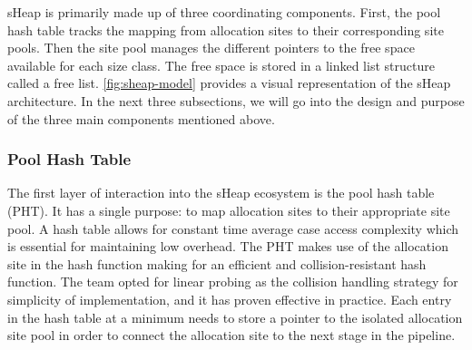 \documentclass[conference]{IEEEtran}
\begin{document}
sHeap is primarily made up of three coordinating components. First, the 
pool hash table tracks the mapping from allocation sites to their 
corresponding site pools. Then the site pool manages the different pointers 
to the free space available for each size class. The free space is stored 
in a linked list structure called a free list. \ref{fig:sheap-model} 
provides a visual representation of the sHeap architecture. In the next 
three subsections, we will go into the design and purpose of the three 
main components mentioned above.

\subsubsection{Pool Hash Table}
The first layer of interaction into the sHeap ecosystem is the pool hash table 
(PHT). It has a single purpose: to map allocation sites to their appropriate 
site pool. A hash table allows for constant time average case access complexity 
which is essential for maintaining low overhead. The PHT makes use of the 
allocation site in the hash function making for an efficient and 
collision-resistant hash function. The team opted for linear probing as the 
collision handling strategy for simplicity of implementation, and it has proven 
effective in practice. Each entry in the hash table at a minimum needs to store 
a pointer to the isolated allocation site pool in order to connect the 
allocation site to the next stage in the pipeline.
\end{document}
